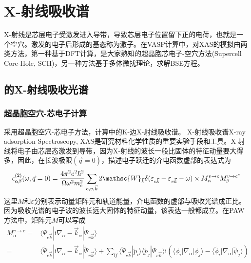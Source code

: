 \section{\rm{X}-射线吸收谱}
\textrm{X}-射线是芯层电子受激发进入导带，导致芯层电子位置留下正的电荷，也就是一个空穴。激发的电子后形成的基态称为激子。在\textrm{VASP}计算中，对\textrm{XAS}的模拟由两类方法，第一种基于\textrm{DFT}计算，是大家熟知的超晶胞芯电子-空穴方法\textrm{(Supercell Core-Hole, SCH)}，另一种方法基于多体微扰理论，求解\textrm{BSE}方程。

\subsection{的\rm{X}-射线吸收光谱}

\subsubsection{超晶胞空穴-芯电子计算}
采用超晶胞空穴-芯电子方法，计算中的\textrm{K-}边X-射线吸收谱。
\textrm{X}-射线吸收谱\textrm{X-ray adsorption Spectroscopy, XAS}是研究材料化学性质的重要实验手段和工具。\textrm{X}-射线将电子由芯层态激发到导带，因为\textrm{X}-射线的波长一般比固体的特征动量要大得多，因此，在长波极限$(\vec q=0)$，描述电子跃迁的介电函数虚部的表达式为
\begin{displaymath}
	\epsilon_{\alpha\beta}^{(2)}(\omega,\vec q=0)=\dfrac{4\pi^2e^2\hbar^2}{\Omega\omega^2m_e^2}\sum_{c,v,\vec k}2\mathsc{W}_{\vec k}\delta(\varepsilon_{c\vec k}-\varepsilon_{v\vec k}-\omega)\times M_{\alpha}^{v\rightarrow c}M_{\beta}^{v\rightarrow c^{\ast}}
\end{displaymath}
这里$M$和$\varepsilon$分别表示动量矩阵元和轨道能量，介电函数的虚部与吸收光谱成正比。因为吸收光谱的电子波的波长远大固体的特征动量，该表达一般都成立。在\textrm{PAW}方法中，矩阵元$M$可以写成
\begin{displaymath}
	\begin{aligned}
		M_{\alpha}^{v\rightarrow c}=&\langle\Psi_{c\vec k}|\mathrm{i}\nabla_{\alpha}-\vec k_{\alpha}|\Psi_{v\vec k}\rangle \\
		=&\langle\tilde{\Psi}_{c\vec k}|\mathrm{i}\nabla_{\alpha}-\vec k_{\alpha}|\tilde{\Psi}_{v\vec k}\rangle+\sum_{ij}\langle\tilde{\Psi}_{c\vec k}|\tilde p_i\rangle\langle\tilde p_j|\Psi_{v\vec k}\rangle\mathrm{i}(\langle\phi_i|\nabla_{\alpha}|\phi_j\rangle-\langle\tilde{\phi}_i|\nabla_{\alpha}|\tilde{\psi}_j\rangle)
	\end{aligned}
\end{displaymath}

